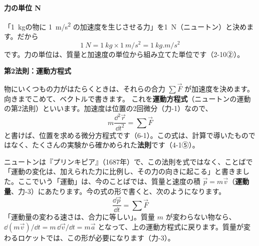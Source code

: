 \noindent\textbf{力の単位 N}\par
\noindent 「\qty{1}{kg}の物に \qty{1}{m/s^2} の加速度を生じさせる力」を\qty{1}{N}（ニュートン）と決めます。だから
\[ \qty{1}{N}=\qty{1}{kg}\times\qty{1}{m/s^2}=\qty{1}{kg.m/s^2} \]
です。力の単位は、質量と加速度の単位から組み立てた単位です（\mbox{2-10②}）。

\noindent\textbf{第2法則：運動方程式}\par
\noindent\label{ph:力-2:undou}物にいくつもの力がはたらくときは、それらの合力 $\sum\vec F$ が加速度を決めます。向きまでこめて、ベクトルで書きます。
これを\textbf{運動方程式}（ニュートンの運動の第2法則）といいます。加速度は位置の2回微分（力-1）なので、
\[ m\frac{\dd^2\vec r}{\dd t^2}=\sum\vec F \]
と書けば、位置を求める微分方程式です（6-1）。この式は、計算で導いたものではなく、たくさんの実験から確かめられた\textbf{法則}です（\mbox{4-1⑤}）。

ニュートンは『プリンキピア』（1687年）で、この法則を式ではなく、ことばで「運動の変化は、加えられた力に比例し、その力の向きに起こる」と書きました。ここでいう「運動」は、今のことばでは、質量と速度の積 $\vec p=m\vec v$（\textbf{運動量}、力-3）にあたります。今の式の形で書くと、次のようになります。
\[ \frac{\dd\vec p}{\dd t}=\sum\vec F \]
「運動量の変わる速さは、合力に等しい」。質量 $m$ が変わらない物なら、$\dd(m\vec v)/\dd t=\allowbreak m\,\dd\vec v/\dd t=\allowbreak m\vec a$ となって、上の運動方程式に戻ります。質量が変わるロケットでは、この形が必要になります（力-3）。

